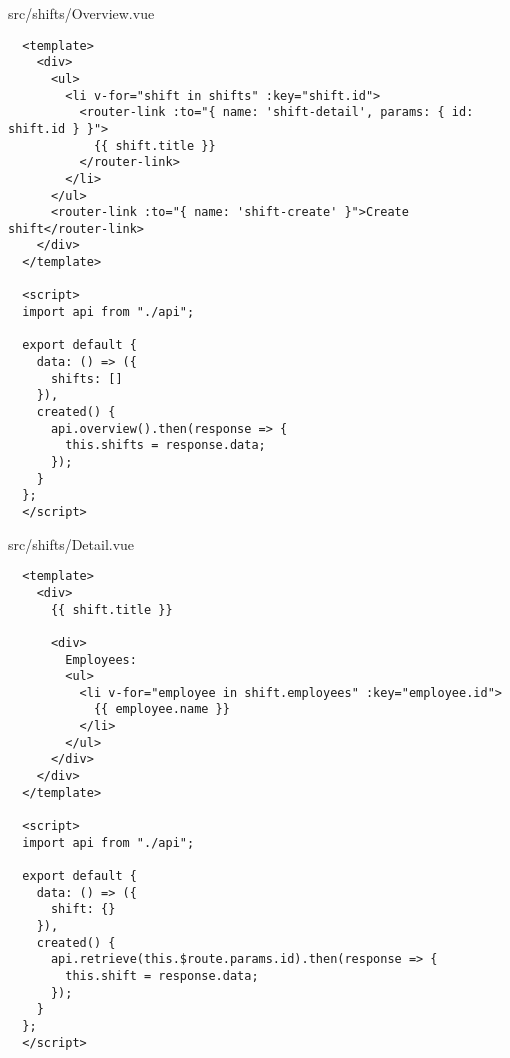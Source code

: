 src/shifts/Overview.vue
\begin{verbatim}
  <template>
    <div>
      <ul>
        <li v-for="shift in shifts" :key="shift.id">
          <router-link :to="{ name: 'shift-detail', params: { id: shift.id } }">
            {{ shift.title }}
          </router-link>
        </li>
      </ul>
      <router-link :to="{ name: 'shift-create' }">Create shift</router-link>
    </div>
  </template>

  <script>
  import api from "./api";

  export default {
    data: () => ({
      shifts: []
    }),
    created() {
      api.overview().then(response => {
        this.shifts = response.data;
      });
    }
  };
  </script>
\end{verbatim}

src/shifts/Detail.vue
\begin{verbatim}
  <template>
    <div>
      {{ shift.title }}

      <div>
        Employees:
        <ul>
          <li v-for="employee in shift.employees" :key="employee.id">
            {{ employee.name }}
          </li>
        </ul>
      </div>
    </div>
  </template>

  <script>
  import api from "./api";

  export default {
    data: () => ({
      shift: {}
    }),
    created() {
      api.retrieve(this.$route.params.id).then(response => {
        this.shift = response.data;
      });
    }
  };
  </script>
\end{verbatim}


